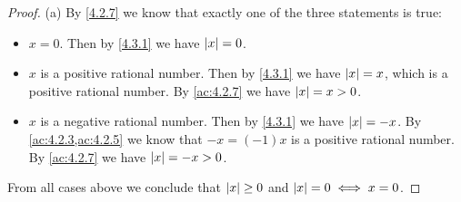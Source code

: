 \begin{proof}{(a)}
	By \cref{4.2.7} we know that exactly one of the three statements is true:
	\begin{itemize}
		\item \(x = 0\).
		      Then by \cref{4.3.1} we have \(\left\lvert x\right\rvert = 0\).
		\item \(x\) is a positive rational number.
		      Then by \cref{4.3.1} we have \(\left\lvert x\right\rvert = x\), which is a positive rational number.
		      By \cref{ac:4.2.7} we have \(\left\lvert x\right\rvert = x > 0\).
		\item \(x\) is a negative rational number.
		      Then by \cref{4.3.1} we have \(\left\lvert x\right\rvert = -x\).
		      By \cref{ac:4.2.3,ac:4.2.5} we know that \(-x = (-1)x\) is a positive rational number.
		      By \cref{ac:4.2.7} we have \(\left\lvert x\right\rvert = -x > 0\).
	\end{itemize}
	From all cases above we conclude that \(\left\lvert x\right\rvert \geq 0\) and \(\left\lvert x\right\rvert = 0 \iff x = 0\).
\end{proof}

